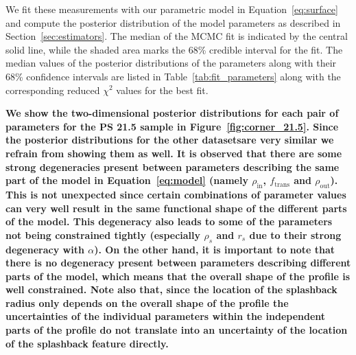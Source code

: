 \documentclass[iop, apjl, twocolappendix, numberedappendix]{emulateapj}
\begin{document}
We fit these measurements with our parametric model in Equation~\ref{eq:surface}
and compute the posterior distribution of the model parameters 
as described in Section~\ref{sec:estimators}. The
median of the MCMC fit is indicated by the central solid line, while
the shaded area marks the 68\% credible interval for the fit. The
median values of the posterior distributions of the parameters along
with their 68\% confidence intervals are listed in
Table~\ref{tab:fit_parameters} along with the corresponding reduced
$\chi^2$ values for the best fit. 

\textbf{We show the two-dimensional posterior
distributions for each pair of parameters for the PS 21.5 sample in 
Figure~\ref{fig:corner_21.5}. Since the posterior distributions for 
the other datasetsare very similar we refrain from showing them as well. 
It is observed that there are some strong degeneracies present between 
parameters describing the same part of the model in Equation~\ref{eq:model} 
(namely $\rho_{\mathrm{in}}$, $f_{\mathrm{trans}}$ and $\rho_{\mathrm{out}}$).
This is not unexpected since certain combinations of parameter values can 
very well result in the same functional shape of the different parts of 
the model. This degeneracy also leads to some of the parameters not being 
constrained tightly (especially $\rho_s$ and $r_s$ due to their strong degeneracy 
with $\alpha$). On the other hand, it is important to note that there is 
no degeneracy present between parameters describing different parts of the 
model, which means that the overall shape of the profile is well constrained. 
Note also that, since the location of the splashback radius only depends on 
the overall shape of the profile the uncertainties of the individual parameters 
within the independent parts of the profile do not translate
into an uncertainty of the location of the splashback feature directly.}
\end{document}
